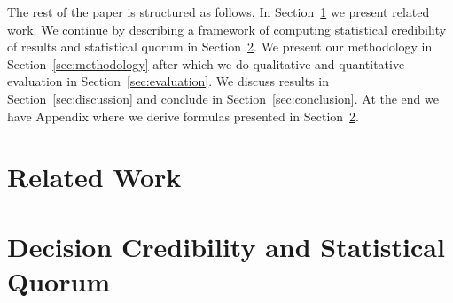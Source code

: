 \documentclass[format=acmsmall, review=true, screen=true, anonymous=true]{acmart}
\begin{document}
The rest of the paper is structured as follows. In Section~\ref{sec:related-work} we
present related work. We continue by describing a framework of computing statistical
credibility of results and statistical quorum in Section~\ref{sec:decision-credibility}.
We present our methodology in Section~\ref{sec:methodology} after which we do qualitative and
quantitative evaluation in Section~\ref{sec:evaluation}. We discuss results in
Section~\ref{sec:discussion} and conclude in Section~\ref{sec:conclusion}. At the end we
have Appendix where we derive formulas presented in Section~\ref{sec:decision-credibility}.

\section{Related Work}
\label{sec:related-work}

%
%

\section{Decision Credibility and Statistical Quorum}
\label{sec:decision-credibility}

%
\end{document}
